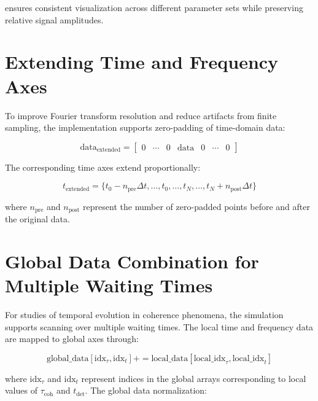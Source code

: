 \noindent
ensures consistent visualization across different parameter sets while preserving relative signal amplitudes.

\section{Extending Time and Frequency Axes}
\label{sec:extending_axes}

\noindent
To improve Fourier transform resolution and reduce artifacts from finite sampling, the implementation supports zero-padding of time-domain data:

\begin{equation}
	\label{eq:zero_padding_matrix}
	\text{data}_{\text{extended}} = \begin{bmatrix}
		0 & \cdots & 0 & \text{data} & 0 & \cdots & 0
	\end{bmatrix}
\end{equation}

\noindent
The corresponding time axes extend proportionally:

\begin{equation}
	\label{eq:extended_time_axis}
	t_{\text{extended}} = \{t_0 - n_{\text{pre}} \Delta t, \ldots, t_0, \ldots, t_N, \ldots, t_N + n_{\text{post}} \Delta t\}
\end{equation}

\noindent
where $n_{\text{pre}}$ and $n_{\text{post}}$ represent the number of zero-padded points before and after the original data.

\section{Global Data Combination for Multiple Waiting Times}
\label{sec:global_data_combination}

\noindent
For studies of temporal evolution in coherence phenomena, the simulation supports scanning over multiple waiting times. The local time and frequency data are mapped to global axes through:

\begin{equation}
	\label{eq:global_mapping_corrected}
	\text{global\_data}[\text{idx}_\tau, \text{idx}_t] += \text{local\_data}[\text{local\_idx}_\tau, \text{local\_idx}_t]
\end{equation}

\noindent
where $\text{idx}_\tau$ and $\text{idx}_t$ represent indices in the global arrays corresponding to local values of $\tau_{\text{coh}}$ and $t_{\text{det}}$. The global data normalization:

